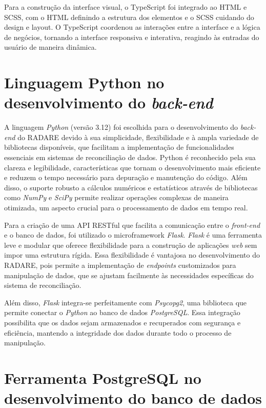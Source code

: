 Para a construção da interface visual, o TypeScript foi integrado ao HTML e SCSS, com o HTML definindo a estrutura dos elementos e o SCSS cuidando do design e layout. O TypeScript coordenou as interações entre a interface e a lógica de negócios, tornando a interface responsiva e interativa, reagindo às entradas do usuário de maneira dinâmica.

\section{Linguagem Python no desenvolvimento do \textit{back-end}}

A linguagem \textit{Python} (versão 3.12) foi escolhida para o desenvolvimento do \textit{back-end} do RADARE devido à sua simplicidade, flexibilidade e à ampla variedade de bibliotecas disponíveis, que facilitam a implementação de funcionalidades essenciais em sistemas de reconciliação de dados. Python é reconhecido pela sua clareza e legibilidade, características que tornam o desenvolvimento mais eficiente e reduzem o tempo necessário para depuração e manutenção do código. Além disso, o suporte robusto a cálculos numéricos e estatísticos através de bibliotecas como \textit{NumPy} e \textit{SciPy} permite realizar operações complexas de maneira otimizada, um aspecto crucial para o processamento de dados em tempo real.

Para a criação de uma API RESTful que facilita a comunicação entre o \textit{front-end} e o banco de dados, foi utilizado o microframework \textit{Flask}. \textit{Flask} é uma ferramenta leve e modular que oferece flexibilidade para a construção de aplicações \textit{web} sem impor uma estrutura rígida. Essa flexibilidade é vantajosa no desenvolvimento do RADARE, pois permite a implementação de \textit{endpoints} customizados para manipulação de dados, que se ajustam facilmente às necessidades específicas do sistema de reconciliação.

Além disso, \textit{Flask} integra-se perfeitamente com \textit{Psycopg2}, uma biblioteca que permite conectar o \textit{Python} ao banco de dados \textit{PostgreSQL}. Essa integração possibilita que os dados sejam armazenados e recuperados com segurança e eficiência, mantendo a integridade dos dados durante todo o processo de manipulação.

\section{Ferramenta PostgreSQL no desenvolvimento do banco de dados}

